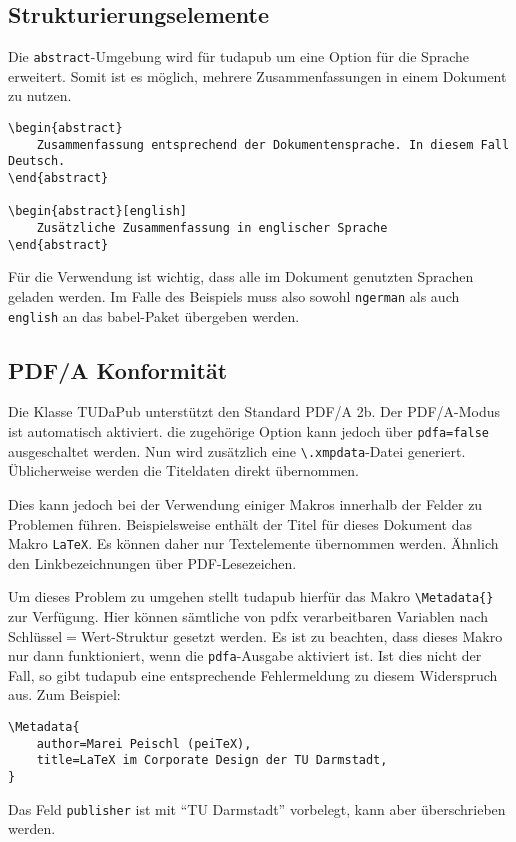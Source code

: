 \documentclass[
	ngerman,
	accentcolor=9c,%
	]{tudapub}
\let\code\texttt
\let\pck\textsf
\let\cls\textsf
\begin{document}
\subsection{Strukturierungselemente}
Die \code{abstract}-Umgebung wird für \cls{tudapub} um eine Option für die Sprache erweitert. Somit ist es möglich, mehrere Zusammenfassungen in einem Dokument zu nutzen.

\begin{verbatim}
\begin{abstract}
	Zusammenfassung entsprechend der Dokumentensprache. In diesem Fall Deutsch.
\end{abstract}

\begin{abstract}[english]
	Zusätzliche Zusammenfassung in englischer Sprache
\end{abstract}
\end{verbatim}

Für die Verwendung ist wichtig, dass alle im Dokument genutzten Sprachen geladen werden. Im Falle des Beispiels muss also sowohl \code{ngerman} als auch \code{english} an das \pck{babel}-Paket übergeben werden.


\subsection{PDF/A Konformität}
Die Klasse TUDaPub unterstützt den Standard PDF/A 2b. Der PDF/A-Modus ist automatisch aktiviert. die zugehörige Option kann jedoch über \code{pdfa=false} ausgeschaltet werden.
Nun wird zusätzlich eine \code{\textbackslash.xmpdata}-Datei generiert. Üblicherweise werden die Titeldaten direkt übernommen.

Dies kann jedoch bei der Verwendung einiger Makros innerhalb der Felder zu Problemen führen. Beispielsweise enthält der Titel für dieses Dokument das Makro \code{\LaTeX}. Es können daher nur Textelemente übernommen werden. Ähnlich den Linkbezeichnungen über PDF-Lesezeichen.

Um dieses Problem zu umgehen stellt \cls{tudapub} hierfür das Makro \code{\textbackslash{}Metadata\{\}} zur Verfügung. Hier können sämtliche von \pck{pdfx} verarbeitbaren Variablen nach Schlüssel$=$Wert-Struktur gesetzt werden. Es ist zu beachten, dass dieses Makro nur dann funktioniert, wenn die \code{pdfa}-Ausgabe aktiviert ist. Ist dies nicht der Fall, so gibt \cls{tudapub} eine entsprechende Fehlermeldung zu diesem Widerspruch aus.
Zum Beispiel:
\begin{verbatim}
\Metadata{
	author=Marei Peischl (peiTeX),
	title=LaTeX im Corporate Design der TU Darmstadt,
}
\end{verbatim}
Das Feld \code{publisher} ist mit \enquote{TU Darmstadt} vorbelegt, kann aber überschrieben werden.
\end{document}
